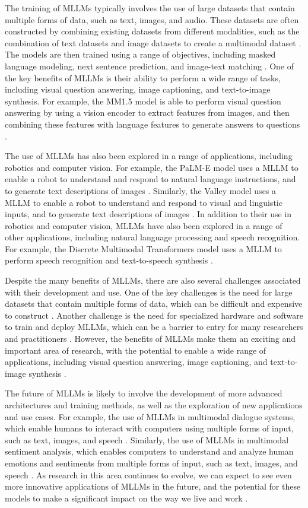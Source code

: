 \documentclass[11pt]{article}
\begin{document}
The training of MLLMs typically involves the use of large datasets that contain multiple forms of data, such as text, images, and audio. These datasets are often constructed by combining existing datasets from different modalities, such as the combination of text datasets and image datasets to create a multimodal dataset \cite{ref275}. The models are then trained using a range of objectives, including masked language modeling, next sentence prediction, and image-text matching \cite{ref78}. One of the key benefits of MLLMs is their ability to perform a wide range of tasks, including visual question answering, image captioning, and text-to-image synthesis. For example, the MM1.5 model is able to perform visual question answering by using a vision encoder to extract features from images, and then combining these features with language features to generate answers to questions \cite{ref276}.

The use of MLLMs has also been explored in a range of applications, including robotics and computer vision. For example, the PaLM-E model uses a MLLM to enable a robot to understand and respond to natural language instructions, and to generate text descriptions of images \cite{ref21}. Similarly, the Valley model uses a MLLM to enable a robot to understand and respond to visual and linguistic inputs, and to generate text descriptions of images \cite{ref277}. In addition to their use in robotics and computer vision, MLLMs have also been explored in a range of other applications, including natural language processing and speech recognition. For example, the Discrete Multimodal Transformers model uses a MLLM to perform speech recognition and text-to-speech synthesis \cite{ref278}.

Despite the many benefits of MLLMs, there are also several challenges associated with their development and use. One of the key challenges is the need for large datasets that contain multiple forms of data, which can be difficult and expensive to construct \cite{ref279}. Another challenge is the need for specialized hardware and software to train and deploy MLLMs, which can be a barrier to entry for many researchers and practitioners \cite{ref280}. However, the benefits of MLLMs make them an exciting and important area of research, with the potential to enable a wide range of applications, including visual question answering, image captioning, and text-to-image synthesis \cite{ref281}.

The future of MLLMs is likely to involve the development of more advanced architectures and training methods, as well as the exploration of new applications and use cases. For example, the use of MLLMs in multimodal dialogue systems, which enable humans to interact with computers using multiple forms of input, such as text, images, and speech \cite{ref282}. Similarly, the use of MLLMs in multimodal sentiment analysis, which enables computers to understand and analyze human emotions and sentiments from multiple forms of input, such as text, images, and speech \cite{ref283}. As research in this area continues to evolve, we can expect to see even more innovative applications of MLLMs in the future, and the potential for these models to make a significant impact on the way we live and work \cite{ref284}.
\end{document}
